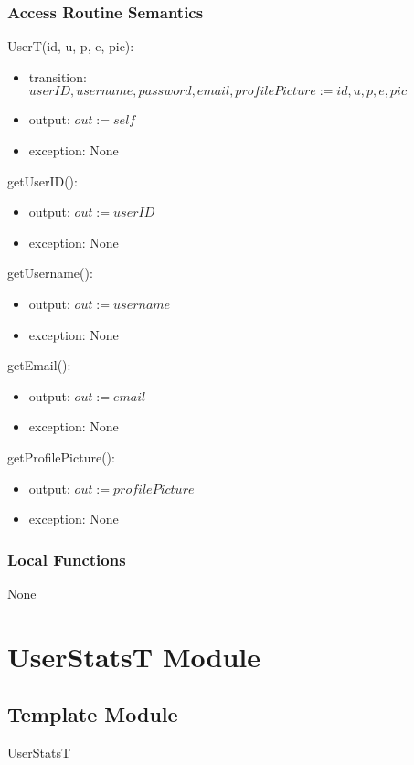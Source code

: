 \documentclass[12pt, titlepage]{article}
\begin{document}
\subsubsection{Access Routine Semantics}

\noindent UserT(id, u, p, e, pic):
\begin{itemize}
\item transition: $userID, username, password, email, profilePicture := id, u, p, e, pic$
\item output: $out := self$
\item exception: None
\end{itemize}

\noindent getUserID():
\begin{itemize}
\item output: $out := userID$
\item exception: None
\end{itemize}

\noindent getUsername():
\begin{itemize}
\item output: $out := username$
\item exception: None
\end{itemize}

\noindent getEmail():
\begin{itemize}
\item output: $out := email$
\item exception: None
\end{itemize}

\noindent getProfilePicture():
\begin{itemize}
\item output: $out := profilePicture$
\item exception: None
\end{itemize}

\subsubsection{Local Functions}

None

\newpage
\section{UserStatsT Module}  \label{UserStatsT}
\subsection{Template Module}
UserStatsT
\end{document}
